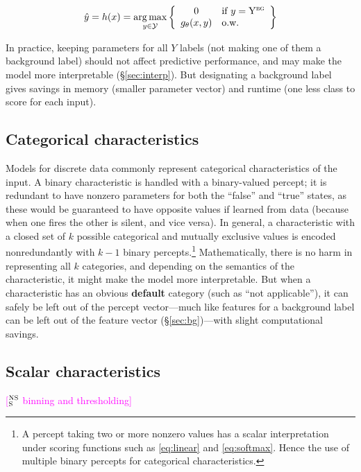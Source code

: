 \documentclass[11pt,letterpaper]{article}
\DeclareMathOperator*{\argmax}{arg\,max}
\newcommand{\ensuretext}[1]{#1}
\newcommand{\nssmarker}{\ensuretext{\textcolor{magenta}{\ensuremath{^{\textsc{NS}}_{\textsc{S}}}}}}
\newcommand{\arkcomment}[3]{\ensuretext{\textcolor{#3}{[#1 #2]}}}
\newcommand{\nss}[1]{\arkcomment{\nssmarker}{#1}{magenta}}
\newcommand{\params}{\mathbf{\theta}}
\newcommand{\Sref}[1]{\S\ref{#1}}
\newcommand{\eref}[1]{\eqref{#1}}
\begin{document}
\begin{equation}\label{eq:classifier-bg}
\hat{y} = h(x) = \argmax_{y\in\mathcal{Y}} \left\{\begin{array}{cl}
0 & \text{if }y=\mathrm{Y}^{\textsc{bg}} \\
g_\params(x,y) & \text{o.w.}\end{array}\right\}
\end{equation}

In practice, keeping parameters for all $Y$ labels (not making one of them a background label) 
should not affect predictive performance, and may make the model more interpretable (\Sref{sec:interp}).
But designating a background label gives savings in memory (smaller parameter vector) and runtime (one less class to score for each input).

\subsection{Categorical characteristics}

Models for discrete data commonly represent categorical characteristics of the input.
A binary characteristic is handled with a binary-valued percept; it is redundant to have 
nonzero parameters for both the ``false'' and ``true'' states, as these would be guaranteed 
to have opposite values if learned from data (because when one fires the other is silent, and vice versa).
In general, a characteristic with a closed set of $k$ possible categorical and mutually exclusive values 
is encoded nonredundantly with $k-1$ binary percepts.\footnote{A percept taking two or more nonzero values has a scalar 
interpretation under scoring functions such as \eref{eq:linear} and \eref{eq:softmax}. 
Hence the use of multiple binary percepts for categorical characteristics.}
Mathematically, there is no harm in representing all $k$ categories, 
and depending on the semantics of the characteristic, it might make the model more interpretable.
But when a characteristic has an obvious {\bf default} category (such as ``not applicable''),
it can safely be left out of the percept vector---much like features for a background label 
can be left out of the feature vector (\Sref{sec:bg})---with slight computational savings.

\subsection{Scalar characteristics}

\nss{binning and thresholding}
\end{document}
